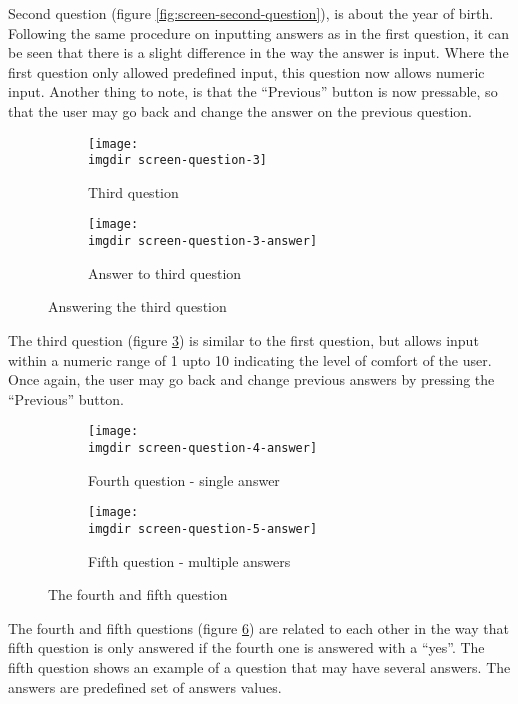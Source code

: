 Second question (figure \ref{fig:screen-second-question}), is about the year of birth. Following the same procedure on inputting answers as in the first question, it can be seen that there is a slight difference in the way the answer is input. Where the first question only allowed predefined input, this question now allows numeric input. Another thing to note, is that the ``Previous'' button is now pressable, so that the user may go back and change the answer on the previous question.
\newpage

\begin{figure}[!htbp]
  \centering
  \begin{subfigure}{.3\textwidth}
    \centering
    \texttt{[image: \\imgdir screen-question-3]}
    \caption{Third question}
    \label{fig:screen-question-3}
  \end{subfigure}
  \begin{subfigure}{.3\textwidth}
    \centering
    \texttt{[image: \\imgdir screen-question-3-answer]}
    \caption{Answer to third question}
    \label{fig:screen-question-3-answer}
  \end{subfigure}
  \caption{Answering the third question}
  \label{fig:screen-third-question}
\end{figure}

The third question (figure \ref{fig:screen-third-question}) is similar to the first question, but allows input within a numeric range of 1 upto 10 indicating the level of comfort of the user. Once again, the user may go back and change previous answers by pressing the ``Previous'' button.
\newpage

\begin{figure}[!htbp]
  \centering
  \begin{subfigure}{.3\textwidth}
    \centering
    \texttt{[image: \\imgdir screen-question-4-answer]}
    \caption{Fourth question - single answer}
    \label{fig:screen-question-4-answer}
  \end{subfigure}
  \begin{subfigure}{.3\textwidth}
    \centering
    \texttt{[image: \\imgdir screen-question-5-answer]}
    \caption{Fifth question - multiple answers}
    \label{fig:screen-question-5-answer}
  \end{subfigure}
  \caption{The fourth and fifth question}
  \label{fig:screen-fourth-and-fifth-question}
\end{figure}

The fourth and fifth questions (figure \ref{fig:screen-fourth-and-fifth-question}) are related to each other in the way that fifth question is only answered if the fourth one is answered with a ``yes''. The fifth question shows an example of a question that may have several answers. The answers are predefined set of answers values.
\newpage

